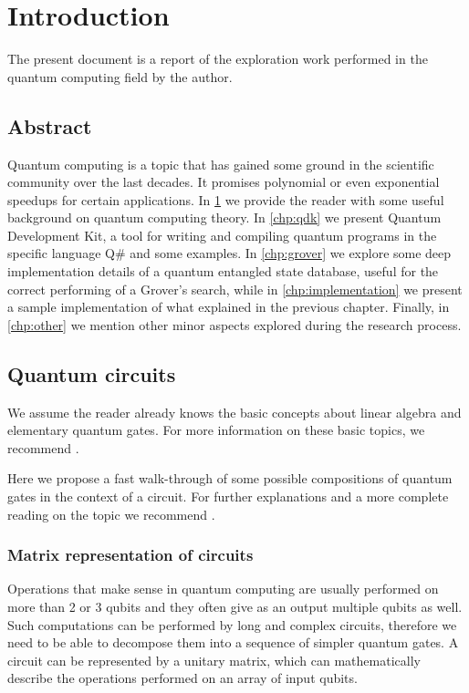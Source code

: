 
\chapter{Introduction}
\label{chp:intro}

The present document is a report of the exploration work performed in the quantum computing field by the author.

\section{Abstract}

Quantum computing is a topic that has gained some ground in the scientific community over the last decades. It promises polynomial or even exponential speedups for certain applications. In \cref{chp:intro} we provide the reader with some useful background on quantum computing theory. In \cref{chp:qdk} we present Quantum Development Kit, a tool for writing and compiling quantum programs in the specific language Q\# and some examples. In \cref{chp:grover} we explore some deep implementation details of a quantum entangled state database, useful for the correct performing of a Grover's search, while in \cref{chp:implementation} we present a sample implementation of what explained in the previous chapter. Finally, in \cref{chp:other} we mention other minor aspects explored during the research process.

\section{Quantum circuits}

We assume the reader already knows the basic concepts about linear algebra and elementary quantum gates. For more information on these basic topics, we recommend \cite{helwer2018quantum, Colin2011Explorations}.

Here we propose a fast walk-through of some possible compositions of quantum gates in the context of a circuit. For further explanations and a more complete reading on the topic we recommend \cite[p. 123--129]{Colin2011Explorations}.

\subsection{Matrix representation of circuits}

Operations that make sense in quantum computing are usually performed on more than 2 or 3 qubits and they often give as an output multiple qubits as well. Such computations can be performed by long and complex circuits, therefore we need to be able to decompose them into a sequence of simpler quantum gates. A circuit can be represented by a unitary matrix, which can mathematically describe the operations performed on an array of input qubits.

